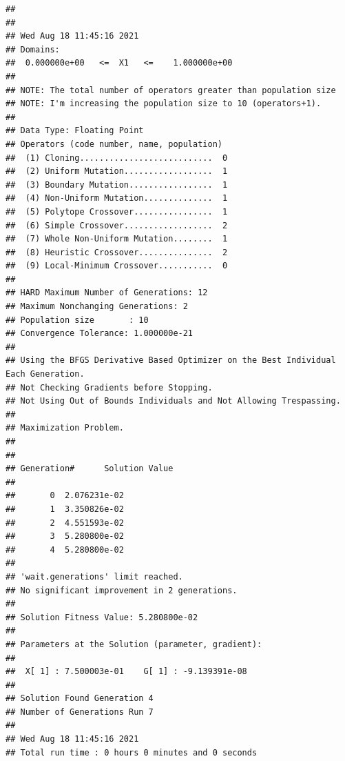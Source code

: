 \documentclass[
  ignorenonframetext,
]{beamer}
\newenvironment{Shaded}{\begin{snugshade}}{\end{snugshade}}
\newcommand{\AttributeTok}[1]{\textcolor[rgb]{0.77,0.63,0.00}{#1}}
\newcommand{\DecValTok}[1]{\textcolor[rgb]{0.00,0.00,0.81}{#1}}
\newcommand{\FunctionTok}[1]{\textcolor[rgb]{0.00,0.00,0.00}{#1}}
\newcommand{\NormalTok}[1]{#1}
\newcommand{\OtherTok}[1]{\textcolor[rgb]{0.56,0.35,0.01}{#1}}
\newcommand{\SpecialCharTok}[1]{\textcolor[rgb]{0.00,0.00,0.00}{#1}}
\begin{document}
\begin{frame}[fragile]{}
\protect\hypertarget{section-55}{}
\begin{Shaded}
\end{Shaded}

\begin{verbatim}
## 
## 
## Wed Aug 18 11:45:16 2021
## Domains:
##  0.000000e+00   <=  X1   <=    1.000000e+00 
## 
## NOTE: The total number of operators greater than population size
## NOTE: I'm increasing the population size to 10 (operators+1).
## 
## Data Type: Floating Point
## Operators (code number, name, population) 
##  (1) Cloning...........................  0
##  (2) Uniform Mutation..................  1
##  (3) Boundary Mutation.................  1
##  (4) Non-Uniform Mutation..............  1
##  (5) Polytope Crossover................  1
##  (6) Simple Crossover..................  2
##  (7) Whole Non-Uniform Mutation........  1
##  (8) Heuristic Crossover...............  2
##  (9) Local-Minimum Crossover...........  0
## 
## HARD Maximum Number of Generations: 12
## Maximum Nonchanging Generations: 2
## Population size       : 10
## Convergence Tolerance: 1.000000e-21
## 
## Using the BFGS Derivative Based Optimizer on the Best Individual Each Generation.
## Not Checking Gradients before Stopping.
## Not Using Out of Bounds Individuals and Not Allowing Trespassing.
## 
## Maximization Problem.
## 
## 
## Generation#      Solution Value
## 
##       0  2.076231e-02
##       1  3.350826e-02
##       2  4.551593e-02
##       3  5.280800e-02
##       4  5.280800e-02
## 
## 'wait.generations' limit reached.
## No significant improvement in 2 generations.
## 
## Solution Fitness Value: 5.280800e-02
## 
## Parameters at the Solution (parameter, gradient):
## 
##  X[ 1] : 7.500003e-01    G[ 1] : -9.139391e-08
## 
## Solution Found Generation 4
## Number of Generations Run 7
## 
## Wed Aug 18 11:45:16 2021
## Total run time : 0 hours 0 minutes and 0 seconds
\end{verbatim}
\end{frame}
\end{document}
